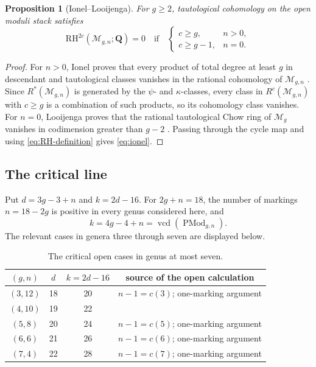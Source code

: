 \documentclass[12pt,reqno]{amsart}
\newcommand{\Q}{\mathbf{Q}}
\newcommand{\M}{\mathcal{M}}
\newcommand{\RH}{\mathrm{RH}}
\newcommand{\PMod}{\operatorname{PMod}}
\newcommand{\vcd}{\operatorname{vcd}}
\newtheorem{proposition}[theorem]{Proposition}
\theoremstyle{definition}
\theoremstyle{remark}
\begin{document}
\begin{proposition}[Ionel--Looijenga]\label{prop:ionel}
For $g\geq2$, tautological cohomology on the open moduli stack satisfies
\begin{equation}\label{eq:ionel}
 \RH^{2c}(\M_{g,n};\Q)=0
 \quad\text{if}\quad
 \begin{cases}
 c\geq g,&n>0,\\
 c\geq g-1,&n=0.
 \end{cases}
\end{equation}
\end{proposition}

\begin{proof}
For $n>0$, Ionel proves that every product of total degree at least $g$ in
descendant and tautological classes vanishes in the rational cohomology of
$\M_{g,n}$ \cite[Theorem~0.1]{Ionel}.  Since $R^*(\M_{g,n})$ is generated
by the $\psi$- and $\kappa$-classes, every class in $R^c(\M_{g,n})$ with
$c\geq g$ is a combination of such products, so its cohomology class
vanishes.  For $n=0$, Looijenga proves that the rational
tautological Chow ring of $\M_g$ vanishes in codimension greater than
$g-2$ \cite[Theorem~1.2]{Looijenga}.  Passing through the cycle map and
using \eqref{eq:RH-definition} gives \eqref{eq:ionel}.
\end{proof}

\subsection{The critical line}

Put $d=3g-3+n$ and $k=2d-16$.  For $2g+n=18$, the number of markings
$n=18-2g$ is positive in every genus considered here, and
\begin{equation}\label{eq:critical-arithmetic}
 k=4g-4+n=\vcd(\PMod_{g,n}).
\end{equation}
The relevant cases in genera three through seven are displayed below.

\begin{table}[ht]
\centering
\caption{The critical open cases in genus at most seven.}
\label{tab:critical}
\small
\begin{tabular}{@{}cccc@{}}
\toprule
$(g,n)$&$d$&$k=2d-16$&source of the open calculation\\
\midrule
$(3,12)$&18&20&$n-1=c(3)$; one-marking argument\\
$(4,10)$&19&22&\cite[Proposition~4.5]{CLP}\\
$(5,8)$ &20&24&$n-1=c(5)$; one-marking argument\\
$(6,6)$ &21&26&$n-1=c(6)$; one-marking argument\\
$(7,4)$ &22&28&$n-1=c(7)$; one-marking argument\\
\bottomrule
\end{tabular}
\end{table}
\end{document}
